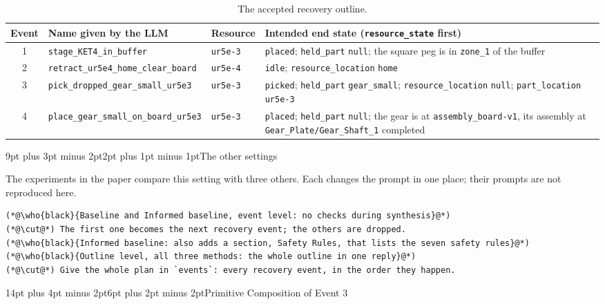 \documentclass[preprint,12pt,authoryear]{elsarticle}
\makeatletter
\renewcommand\section{\@startsection{section}{1}{\z@}%
  {14pt plus 4pt minus 2pt}{6pt plus 2pt minus 2pt}{\large\bfseries\boldmath}}
\renewcommand\subsection{\@startsection{subsection}{2}{\z@}%
  {9pt plus 3pt minus 2pt}{2pt plus 1pt minus 1pt}{\normalsize\bfseries}}
\newcommand{\who}[2]{{\normalfont\sffamily\bfseries\footnotesize\color{#1}#2}}
\let\code\nolinkurl
\makeatother
\begin{document}
\begin{table}[H]
\centering\footnotesize
\setlength{\tabcolsep}{5pt}
\begin{tabularx}{\linewidth}{@{}c l l Y@{}}
\toprule
Event & Name given by the LLM & Resource & Intended end state (\code{resource_state} first) \\
 & \code{stage_KET4_in_buffer} & \code{ur5e-3} & \code{placed}; \code{held_part} \code{null}; the square peg is in \code{zone_1} of the buffer \\
2 & \code{retract_ur5e4_home_clear_board} & \code{ur5e-4} & \code{idle}; \code{resource_location} \code{home} \\
3 & \code{pick_dropped_gear_small_ur5e3} & \code{ur5e-3} & \code{picked}; \code{held_part} \code{gear_small}; \code{resource_location} \code{null}; \code{part_location} \code{ur5e-3} \\
4 & \code{place_gear_small_on_board_ur5e3} & \code{ur5e-3} & \code{placed}; \code{held_part} \code{null}; the gear is at \code{assembly_board-v1}, its assembly at \code{Gear_Plate/Gear_Shaft_1} completed \\
\bottomrule
\end{tabularx}
\caption{The accepted recovery outline.}\label{tab:outline}
\end{table}

\subsection{The other settings}

The experiments in the paper compare this setting with three others. Each changes the prompt in
one place; their prompts are not reproduced here.

\begin{lstlisting}[style=quoteline]
(*@\who{black}{Baseline and Informed baseline, event level: no checks during synthesis}@*)
(*@\cut@*) The first one becomes the next recovery event; the others are dropped.
(*@\who{black}{Informed baseline: also adds a section, Safety Rules, that lists the seven safety rules}@*)
(*@\who{black}{Outline level, all three methods: the whole outline in one reply}@*)
(*@\cut@*) Give the whole plan in `events`: every recovery event, in the order they happen.
\end{lstlisting}

\section{Primitive Composition of Event 3}\label{sec:composition}
\end{document}
